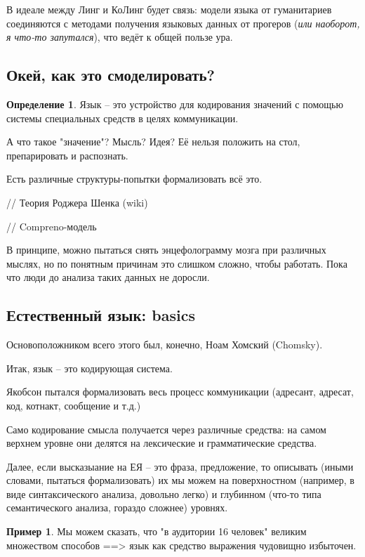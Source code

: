 \documentclass[a4paper,12pt]{article}
\theoremstyle{plain} %
\theoremstyle{definition} %
\newtheorem{definition}{Определение}
\newtheorem{example}{Пример}
\theoremstyle{remark} %
\begin{document}
	В идеале между Линг и КоЛинг будет связь: модели языка от гуманитариев соединяются с методами получения языковых данных от прогеров ({\it или наоборот, я что-то запутался}), что ведёт к общей пользе ура.

	\subsection { Окей, как это смоделировать? }
	
	\begin{definition}
		Язык -- это устройство для кодирования значений с помощью системы специальных средств в целях коммуникации.
	\end{definition}
	
	А что такое "значение"? Мысль? Идея? Её нельзя положить на стол, препарировать и распознать.
	
	Есть различные структуры-попытки формализовать всё это.
	
	// Теория Роджера Шенка (wiki) %
	
	// Compreno-модель %
	
	В принципе, можно пытаться снять энцефолограмму мозга при различных мыслях, но по понятным причинам это слишком сложно, чтобы работать. Пока что люди до анализа таких данных не доросли.
	
	\subsection { Естественный язык: basics }
	
	Основоположником всего этого был, конечно, Ноам Хомский (Chomsky).
	
	Итак, язык -- это кодирующая система.
	
	Якобсон пытался формализовать весь процесс коммуникации (адресант, адресат, код, котнакт, сообщение и т.д.) %
	
	Само кодирование смысла получается через различные средства: на самом верхнем уровне они делятся на лексические и грамматические средства.
	
	Далее, если высказыание на ЕЯ -- это фраза, предложение, то описывать (иными словами, пытаться формализовать) их мы можем на поверхностном (например, в виде синтаксического анализа, довольно легко) и глубинном (что-то типа семантического анализа, гораздо сложнее) уровнях.
	
	\begin{example}
		Мы можем сказать, что "в аудитории 16 человек" великим множеством способов ==> язык как средство выражения чудовищно избыточен.
	\end{example}
	
\end{document}
